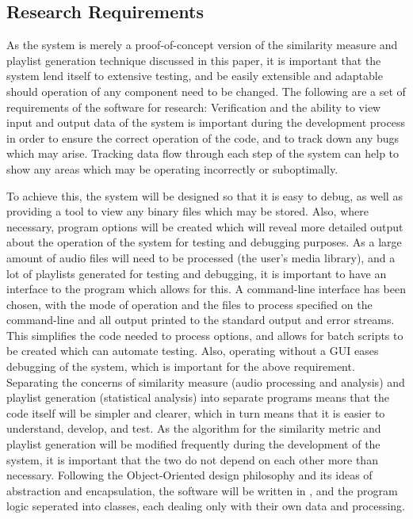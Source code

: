 \subsection{Research Requirements}
As the system is merely a proof-of-concept version of the similarity measure and playlist generation technique discussed in this paper, it is important that the system lend itself to extensive testing, and be easily extensible and adaptable should operation of any component need to be changed. The following are a set of requirements of the software for research: 
Verification and the ability to view input and output data of the system is important during the development process in order to ensure the correct operation of the code, and to track down any bugs which may arise. Tracking data flow through each step of the system can help to show any areas which may be operating incorrectly or suboptimally.

To achieve this, the system will be designed so that it is easy to debug, as well as providing a tool to view any binary files which may be stored. Also, where necessary, program options will be created which will reveal more detailed output about the operation of the system for testing and debugging purposes.
As a large amount of audio files will need to be processed (the user's media library), and a lot of playlists generated for testing and debugging, it is important to have an interface to the program which allows for this. A command-line interface has been chosen, with the mode of operation and the files to process specified on the command-line and all output printed to the standard output and error streams. This simplifies the code needed to process options, and allows for batch scripts to be created which can automate testing. Also, operating without a GUI eases debugging of the system, which is important for the above requirement.
Separating the concerns of similarity measure (audio processing and analysis) and playlist generation (statistical analysis) into separate programs means that the code itself will be simpler and clearer, which in turn means that it is easier to understand, develop, and test. As the algorithm for the similarity metric and playlist generation will be modified frequently during the development of the system, it is important that the two do not depend on each other more than necessary. Following the Object-Oriented design philosophy and its ideas of abstraction and encapsulation, the software will be written in , and the program logic seperated into classes, each dealing only with their own data and processing.
